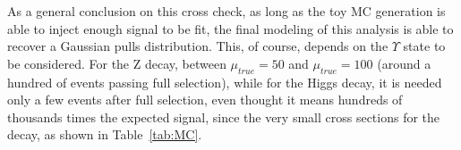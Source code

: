 As a general conclusion on this cross check, as long as the toy MC generation is able to inject enough signal to be fit, the final modeling of this analysis is able to recover a Gaussian pulls distribution. This, of course, depends on the $\Upsilon$ state to be considered. For the Z decay, between $\mu_{true} = 50$ and  $\mu_{true} = 100$ (around a hundred of events passing full selection), while for the Higgs decay, it is needed only a few events after full selection, even thought it means hundreds of thousands times the expected signal, since the very small cross sections for the decay, as shown in Table~\ref{tab:MC}.

\clearpage

